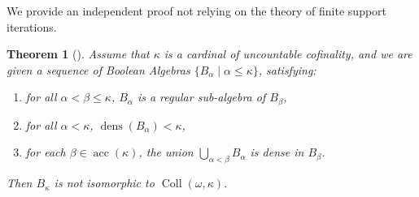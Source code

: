 \documentclass[11pt]{amsart}
\newtheorem{thm}{Theorem}[section]
\theoremstyle{definition}
\DeclareMathOperator{\acc}{acc}
\DeclareMathOperator{\dens}{dens}
\newcommand{\collkappa}{\operatorname{Coll}(\omega,\kappa)}
\begin{document}
We provide an independent proof not relying on the theory of finite support iterations.

\begin{thm}[\cite{jech}] \label{lastthm}
    Assume that $\kappa$ is a cardinal of uncountable cofinality, and we are given a sequence of Boolean Algebras $\{B_\alpha \mid \alpha \le \kappa \}$, satisfying:
\begin{enumerate}
    \item for all $\alpha<\beta\le\kappa$, $B_\alpha$ is a regular sub-algebra of $B_\beta$,
    \item for all $\alpha<\kappa$, $\dens(B_\alpha)<\kappa$,
    \item for each $\beta \in \acc(\kappa)$, the union $\displaystyle\bigcup_{\alpha<\beta}B_\alpha$ is dense in $B_\beta$.
\end{enumerate}
Then $B_\kappa$ is not isomorphic to $\collkappa$.
\end{thm}
\end{document}
